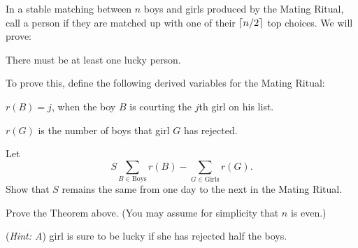 \documentclass[12pt,oneside]{article}
\newcommand{\hint}[1]{({\it Hint: #1})}
\begin{document}

\providecommand{\boys}{\text{Boys}}
\providecommand{\girls}{\text{Girls}}



\begin{problem}{0}
In a stable matching between $n$ boys and girls produced by the Mating
Ritual, call a person  if they are matched up with one of
their $\left\lceil n/2\right\rceil$ top choices.  We will prove:
\begin{theorem*}%
There must be at least one lucky person.
\end{theorem*}

To prove this, define the following derived variables for the Mating Ritual:
\begin{description}
\item $r(B) = j$, when the boy $B$ is courting the $j$th girl
on his list.

\item $r(G)$ is the number of boys that girl $G$ has rejected.
\end{description}

\begin{problemparts}

 \label{Ssame}
Let
\begin{equation}\label{Seqsumb}
S  \sum_{B \in \boys} r(B) - \sum_{G \in \girls} r(G).
\end{equation}
Show that $S$ remains the same from one day to the next in the Mating
Ritual.


 Prove the Theorem above.                        %
(You may assume for simplicity that $n$ is even.)

\hint A girl is sure to be lucky if she has rejected half the boys.


\end{problemparts}
\end{problem}
\end{document}
